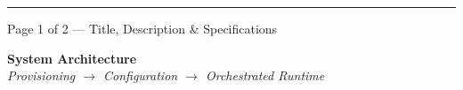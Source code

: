 \documentclass[11pt]{article}
\begin{document}
\vfill
{\small\color{rulegray!60!black}\hrule}
\begin{center}
\small\color{expressgray} Page 1 of 2 --- Title, Description \& Specifications
\end{center}

\newpage


\begin{center}
  {\color{navy}\LARGE\bfseries System Architecture}\\[2pt]
  {\small\itshape Provisioning $\rightarrow$ Configuration $\rightarrow$ Orchestrated Runtime}
\end{center}
\vspace{6pt}
\end{document}
